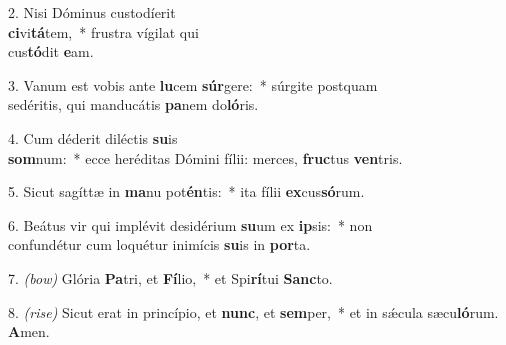 2. Nisi Dóminus custodíerit\\ \textbf{ci}vi\textbf{tá}tem,~* frustra vígilat qui\\ cus\textbf{tó}dit \textbf{e}am.

3. Vanum est vobis ante \textbf{lu}cem \textbf{súr}gere:~* súrgite postquam\\ sedéritis, qui manducátis \textbf{pa}nem do\textbf{ló}ris.

4. Cum déderit diléctis \textbf{su}is\\ \textbf{som}num:~* ecce heréditas Dómini fílii: merces, \textbf{fruc}tus \textbf{ven}tris.

5. Sicut sagíttæ in \textbf{ma}nu pot\textbf{én}tis:~* ita fílii \textbf{ex}cus\textbf{só}rum.

6. Beátus vir qui implévit desidérium \textbf{su}um ex \textbf{ip}sis:~* non\\ confundétur cum loquétur inimícis \textbf{su}is in \textbf{por}ta.

7. {\color{red}\textit{(bow)}} Glória \textbf{Pa}tri, et \textbf{Fí}lio,~* et Spi\textbf{rí}tui \textbf{Sanc}to.

8. {\color{red}\textit{(rise)}} Sicut erat in princípio, et \textbf{nunc}, et \textbf{sem}per,~* et in s\'{\ae}cula sæcu\textbf{ló}rum. \textbf{A}men.